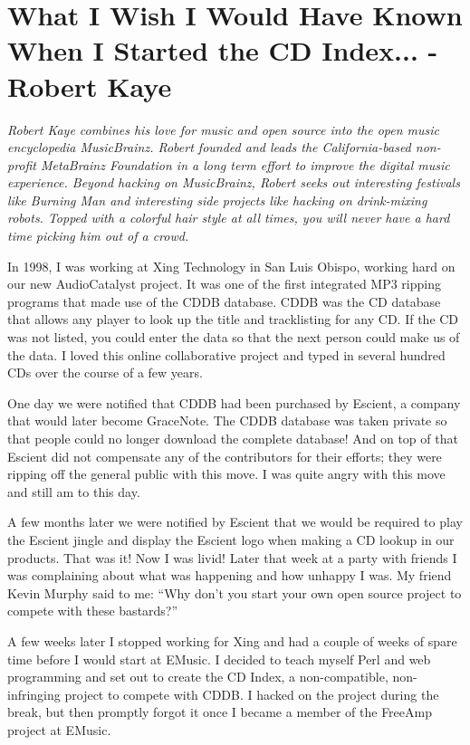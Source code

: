 \chapter{What I Wish I Would Have Known When I Started the CD Index... - Robert
Kaye}

\textit{Robert Kaye combines his love for music and open source into the open
music encyclopedia MusicBrainz. Robert founded and leads the California-based
non-profit MetaBrainz Foundation in a long term effort to improve the digital
music experience. Beyond hacking on MusicBrainz, Robert seeks out interesting
festivals like Burning Man and interesting side projects like hacking on drink-mixing robots. Topped with a colorful hair style at all times, you will never have a hard time picking him out of a crowd.}

In 1998, I was working at Xing Technology in San Luis Obispo, working hard on
our new AudioCatalyst project. It was one of the first integrated MP3 ripping
programs that made use of the CDDB database. CDDB was the CD database that
allows any player to look up the title and tracklisting for any CD. If the CD
was not listed, you could enter the data so that the next person could make us
of the data. I loved this online collaborative project and typed in several
hundred CDs over the course of a few years.

One day we were notified that CDDB had been purchased by Escient, a company that
would later become GraceNote. The CDDB database was taken private so that people
could no longer download the complete database! And on top of that Escient did
not compensate any of the contributors for their efforts; they were ripping off
the general public with this move. I was quite angry with this move and still am
to this day.

A few months later we were notified by Escient that we would be required to play
the Escient jingle and display the Escient logo when making a CD lookup in our
products. That was it! Now I was livid! Later that week at a party with friends
I was complaining about what was happening and how unhappy I was. My friend
Kevin Murphy said to me: ``Why don’t you start your own open source project to
compete with these bastards?''

A few weeks later I stopped working for Xing and had a couple of weeks of spare
time before I would start at EMusic. I decided to teach myself Perl and web
programming and set out to create the CD Index, a non-compatible, non-infringing
project to compete with CDDB. I hacked on the project during the break, but then
promptly forgot it once I became a member of the FreeAmp project at EMusic.


